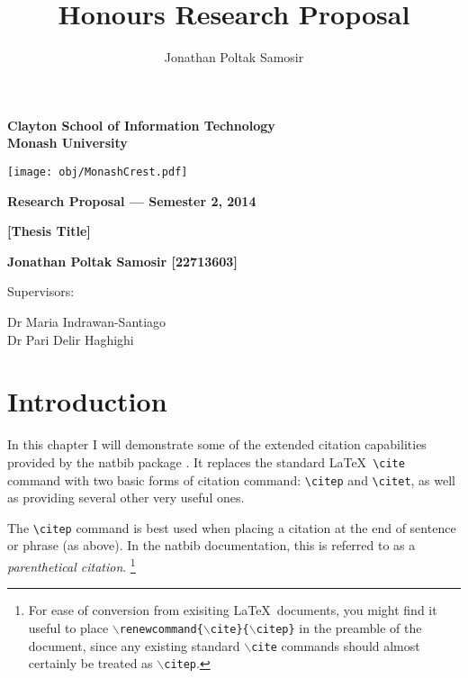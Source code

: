 \documentclass[a4paper,11pt]{article}
\author{Jonathan Poltak Samosir}
\title{Honours Research Proposal}
\begin{document}
\thispagestyle{empty} %
\renewcommand{\thepage}{\roman{page}}

\begin{spacing}{1.5}
\begin{center}
{\Large \bfseries
Clayton School of Information Technology\\
Monash University}

\vspace*{30mm}

\texttt{[image: obj/MonashCrest.pdf]}

\vspace*{15mm}

{\large \bfseries
Research Proposal --- Semester 2, 2014
}

\vspace*{10mm}

{\LARGE \bfseries
[Thesis Title]
}

\vspace*{20mm}

{\large \bfseries
Jonathan Poltak Samosir [22713603]

\vspace*{20mm}

Supervisors: \parbox[t]{50mm}{Dr Maria Indrawan-Santiago\\Dr Pari Delir Haghighi}
}

\end{center}
\end{spacing}

\newpage

\tableofcontents

\newpage
\setcounter{page}{1}
\renewcommand{\thepage}{\arabic{page}}

\section{Introduction}
In this chapter I will demonstrate some of the extended citation
capabilities provided by the {\sf natbib} package \cite{Dal1999}. It
replaces the standard \LaTeX\ \verb+\cite+ command with two basic forms of
citation command: \verb+\citep+ and \verb+\citet+, as well as providing
several other very useful ones.

The \verb+\citep+ command is best used when placing a citation at the end
of sentence or phrase (as above).  In the {\sf natbib} documentation, this
is referred to as a \emph{parenthetical citation}.%
\footnote{For ease of conversion from exisiting \LaTeX\ documents, you
might find it useful to place
\texttt{$\backslash$renewcommand\{$\backslash$cite\}\{$\backslash$citep\}}
in the preamble of the document, since any existing standard
\texttt{$\backslash$cite} commands should almost certainly be treated as
\texttt{$\backslash$citep}.}
\end{document}
